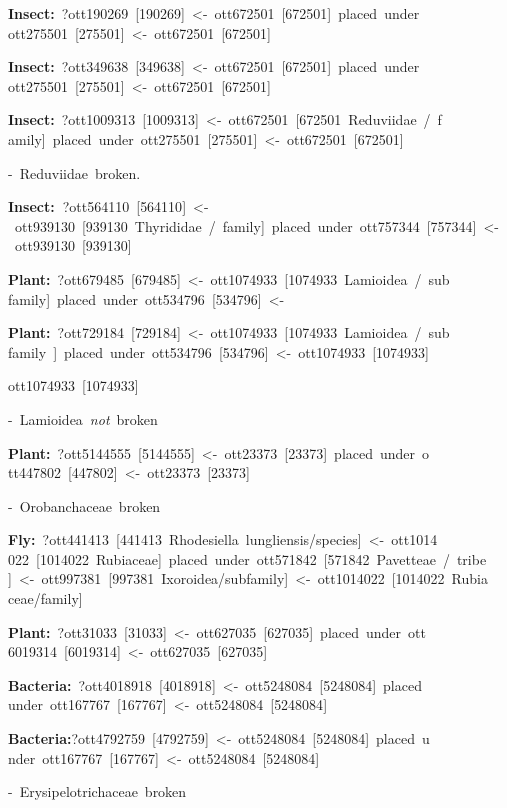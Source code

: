 \documentclass[english]{article}
\begin{document}
\textbf{Insect:}~?ott190269~{[}190269{]}~<-~ott672501~{[}672501{]}~placed~under~ ott275501~{[}275501{]}~<-~ott672501~{[}672501{]}~

\textbf{Insect:}~?ott349638~{[}349638{]}~<-~ott672501~{[}672501{]}~placed~under~ ott275501~{[}275501{]}~<-~ott672501~{[}672501{]}~

\textbf{Insect:}~?ott1009313~{[}1009313{]}~<-~ott672501~{[}672501~Reduviidae~/~f amily{]}~placed~under~ott275501~{[}275501{]}~<-~ott672501~{[}672501{]}~

-~Reduviidae~broken.

\textbf{Insect:~}?ott564110~{[}564110{]}~<-~ott939130~{[}939130~Thyrididae~/~family{]}~placed~under~ott757344~{[}757344{]}~<-~ott939130~{[}939130{]}~

\textbf{Plant:}~?ott679485~{[}679485{]}~<-~ott1074933~{[}1074933~Lamioidea~/~sub family{]}~placed~under~ott534796~{[}534796{]}~<-~

\textbf{Plant:}~?ott729184~{[}729184{]}~<-~ott1074933~{[}1074933~Lamioidea~/~sub family~{]}~placed~under~ott534796~{[}534796{]}~<-~ott1074933~{[}1074933{]}~

ott1074933~{[}1074933{]}~

-~Lamioidea~\emph{not}~broken

\textbf{Plant:}~?ott5144555~{[}5144555{]}~<-~ott23373~{[}23373{]}~placed~under~o tt447802~{[}447802{]}~<-~ott23373~{[}23373{]}

-~Orobanchaceae~broken

\textbf{Fly:}~?ott441413~{[}441413~Rhodesiella~lungliensis/species{]}~<-~ott1014 022~{[}1014022~Rubiaceae{]}~placed~under~ott571842~{[}571842~Pavetteae~/~tribe{ ]}~<-~ott997381~{[}997381~Ixoroidea/subfamily{]}~<-~ott1014022~{[}1014022~Rubia ceae/family{]}

\textbf{Plant:}~?ott31033~{[}31033{]}~<-~ott627035~{[}627035{]}~placed~under~ott 6019314~{[}6019314{]}~<-~ott627035~{[}627035{]}~

\textbf{Bacteria:}~?ott4018918~{[}4018918{]}~<-~ott5248084~{[}5248084{]}~placed~ under~ott167767~{[}167767{]}~<-~ott5248084~{[}5248084{]}~

\textbf{Bacteria:}?ott4792759~{[}4792759{]}~<-~ott5248084~{[}5248084{]}~placed~u nder~ott167767~{[}167767{]}~<-~ott5248084~{[}5248084{]}~

-~Erysipelotrichaceae~broken 




\end{document}
